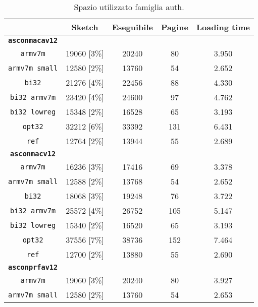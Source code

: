 \begin{table}[h]
    \caption{Spazio utilizzato famiglia auth.}
    \centering
    \begin{adjustbox}{width=245pt}
	\begin{tabular}{|c|c|c|c|c|}
		\hline
         & \textbf{Sketch} & \textbf{Eseguibile} & \textbf{Pagine} & \textbf{Loading time} \\
        \hline
        \texttt{\textbf{asconmacav12}} & & & & \\
        \hline
        \texttt{armv7m} & 19060 [3\%] & 20240 & 80 & 3.950 \\
        \hline
        \texttt{armv7m small} & 12580 [2\%] & 13760 & 54 & 2.652 \\
        \hline
        \texttt{bi32} & 21276 [4\%] & 22456 & 88 & 4.330 \\
        \hline
        \texttt{bi32 armv7m} & 23420 [4\%] & 24600 & 97 & 4.762 \\
        \hline
        \texttt{bi32 lowreg} & 15348 [2\%] & 16528 & 65 & 3.193 \\
        \hline
        \texttt{opt32} & 32212 [6\%] & 33392 & 131 & 6.431 \\
        \hline
        \texttt{ref} & 12764 [2\%] & 13944 & 55 & 2.689 \\
        \hline
        \texttt{\textbf{asconmacv12}} & & & & \\
        \hline
        \texttt{armv7m} & 16236 [3\%] & 17416 & 69 & 3.378 \\
        \hline
        \texttt{armv7m small} & 12588 [2\%] & 13768 & 54 & 2.652 \\
        \hline
        \texttt{bi32} & 18068 [3\%] & 19248 & 76 & 3.722 \\
        \hline
        \texttt{bi32 armv7m} & 25572 [4\%] & 26752 & 105 & 5.147 \\
        \hline
        \texttt{bi32 lowreg} & 15340 [2\%] & 16520 & 65 & 3.193 \\
        \hline
        \texttt{opt32} & 37556 [7\%] & 38736 & 152 & 7.464 \\
        \hline
        \texttt{ref} & 12700 [2\%] & 13880 & 55 & 2.690 \\
        \hline
        \texttt{\textbf{asconprfav12}} & & & & \\
        \hline
        \texttt{armv7m} & 19060 [3\%] & 20240 & 80 & 3.927 \\
        \hline
        \texttt{armv7m small} & 12580 [2\%] & 13760 & 54 & 2.653 \\

\end{tabular}
\end{adjustbox}
\end{table}

